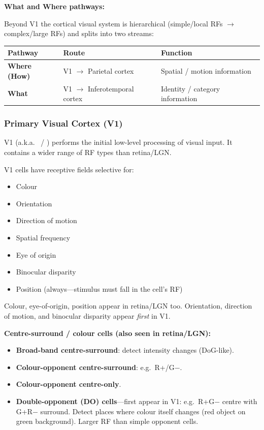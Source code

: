 \separator

\textbf{What and Where pathways:}

Beyond V1 the cortical visual system is hierarchical (simple/local RFs $\rightarrow$ complex/large RFs) and splits into two streams:

\begin{center}
\renewcommand{\arraystretch}{1.3}
\begin{tabular}{@{} l l l @{}}
\toprule
\textbf{Pathway} & \textbf{Route} & \textbf{Function} \\
\midrule
\textbf{Where (How)} & V1 $\rightarrow$ Parietal cortex & Spatial / motion information \\
\textbf{What} & V1 $\rightarrow$ Inferotemporal cortex & Identity / category information \\
\bottomrule
\end{tabular}
\end{center}

\bigseparator

\subsubsection{Primary Visual Cortex (V1)}

V1 (a.k.a.\  / ) performs the initial low-level processing of visual input. It contains a wider range of RF types than retina/LGN.

\begin{defbox}
V1 cells have receptive fields selective for:
\begin{itemize}
  \item Colour
  \item Orientation
  \item Direction of motion
  \item Spatial frequency
  \item Eye of origin
  \item Binocular disparity
  \item Position (always---stimulus must fall in the cell's RF)
\end{itemize}
Colour, eye-of-origin, position appear in retina/LGN too. Orientation, direction of motion, and binocular disparity appear \emph{first} in V1.
\end{defbox}

\separator

\textbf{Centre-surround / colour cells (also seen in retina/LGN):}
\begin{itemize}
  \item \textbf{Broad-band centre-surround}: detect intensity changes (DoG-like).
  \item \textbf{Colour-opponent centre-surround}: e.g.\ R+/G$-$.
  \item \textbf{Colour-opponent centre-only}.
  \item \textbf{Double-opponent (DO) cells}---first appear in V1: e.g.\ R+G$-$ centre with G+R$-$ surround. Detect places where colour itself changes (red object on green background). Larger RF than simple opponent cells.
\end{itemize}


